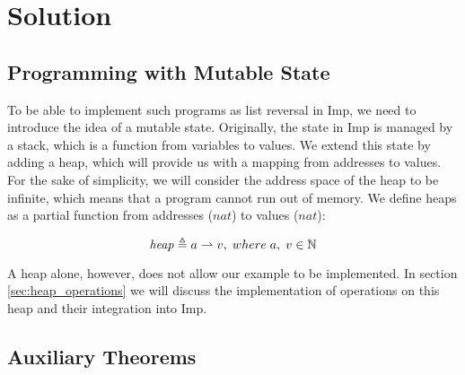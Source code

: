 \section{Solution}
\subsection{Programming with Mutable State}
\label{sec:programming_with_mutable_state}
To be able to implement such programs as list reversal in Imp, we need to introduce the idea of a mutable state. Originally, the state in Imp is managed by a stack, which is a function from variables to values. We extend this state by adding a heap, which will provide us with a mapping from addresses to values. For the sake of simplicity, we will consider the address space of the heap to be infinite, which means that a program cannot run out of memory. We define heaps as a partial function from addresses ($nat$) to values ($nat$):

\[
\mathit{heap} \mathrel{\triangleq} a\rightharpoonup v, \; where\; a, \;v \in \mathbb{N}
\] 

A heap alone, however, does not allow our example to be implemented. In section \ref{sec:heap_operations} we will discuss the implementation of operations on this heap and their integration into Imp. 





\subsection{Auxiliary Theorems}


